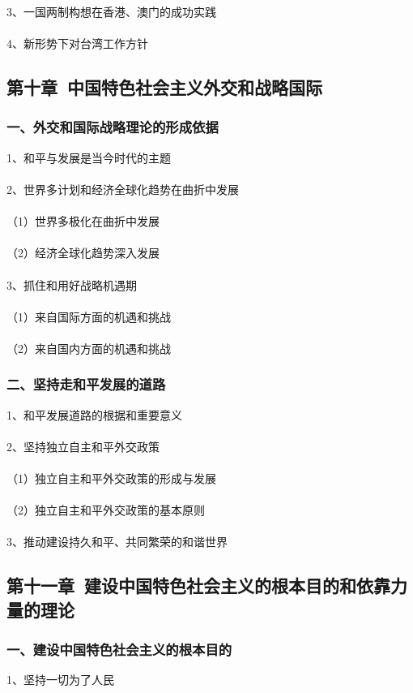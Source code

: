 \documentclass{ctexart}
\begin{document}
3、一国两制构想在香港、澳门的成功实践
\\\\

4、新形势下对台湾工作方针

\subsection{第十章\ 中国特色社会主义外交和战略国际}
\subsubsection{一、外交和国际战略理论的形成依据}
1、和平与发展是当今时代的主题
\\\\

2、世界多计划和经济全球化趋势在曲折中发展
\\\\
（1）世界多极化在曲折中发展
\\\\
（2）经济全球化趋势深入发展
\\\\

3、抓住和用好战略机遇期
\\\\
（1）来自国际方面的机遇和挑战
\\\\
（2）来自国内方面的机遇和挑战
\subsubsection{二、坚持走和平发展的道路}
1、和平发展道路的根据和重要意义
\\\\

2、坚持独立自主和平外交政策
\\\\
（1）独立自主和平外交政策的形成与发展
\\\\
（2）独立自主和平外交政策的基本原则
\\\\

3、推动建设持久和平、共同繁荣的和谐世界


\subsection{第十一章\ 建设中国特色社会主义的根本目的和依靠力量的理论}
\subsubsection{一、建设中国特色社会主义的根本目的}
1、坚持一切为了人民
\\\\
\end{document}
